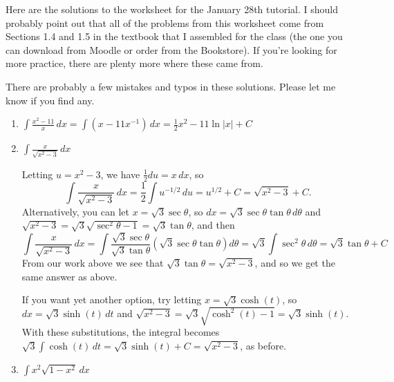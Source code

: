 \documentclass[12pt]{article}
\newcommand{\di}{\displaystyle}
\newcommand{\abs}[1]{\lvert #1\rvert}
\begin{document}
\thispagestyle{fancy}
Here are the solutions to the worksheet for the January 28th tutorial. I should probably point out that all of the problems from this worksheet come from Sections 1.4 and 1.5 in the textbook that I assembled for the class (the one you can download from Moodle or order from the Bookstore). If you're looking for more practice, there are plenty more where these came from.

There are probably a few mistakes and typos in these solutions. Please let me know if you find any.

 \begin{enumerate}
 \item  $\di \int \frac{x^2-11}{x}\,dx = \int (x-11x^{-1})\,dx  = \frac{1}{2}x^2-11\ln\abs{x}+C$

 \item $\di \int \frac{x}{\sqrt{x^2-3}}\,dx$

\medskip

Letting $u=x^2-3$, we have $\frac{1}{2}du = x\,dx$, so
\[
 \int\frac{x}{\sqrt{x^2-3}}\,dx = \frac{1}{2}\int u^{-1/2}\,du = u^{1/2}+C = \sqrt{x^2-3}+C.
\]
Alternatively, you can let $x=\sqrt{3}\sec\theta$, so $dx = \sqrt{3}\sec\theta\tan\theta\,d\theta$ and $\sqrt{x^2-3} = \sqrt{3}\sqrt{\sec^2\theta-1} = \sqrt{3}\tan\theta$, and then
\[
 \int\frac{x}{\sqrt{x^2-3}}\,dx = \int \frac{\sqrt{3}\sec\theta}{\sqrt{3}\tan\theta}(\sqrt{3}\sec\theta\tan\theta)d\theta = \sqrt{3}\int\sec^2\theta\,d\theta = \sqrt{3}\tan\theta+C
\]
From our work above we see that $\sqrt{3}\tan\theta = \sqrt{x^2-3}$, and so we get the same answer as above.

If you want yet another option, try letting $x=\sqrt{3}\cosh(t)$, so $dx = \sqrt{3}\sinh(t)\,dt$ and $\sqrt{x^2-3} = \sqrt{3}\sqrt{\cosh^2(t)-1} = \sqrt{3}\sinh(t)$. With these substitutions, the integral becomes $\di \sqrt{3}\int\cosh(t)\,dt = \sqrt{3}\sinh(t)+C = \sqrt{x^2-3}$, as before. 

 \item $\di \int x^2\sqrt{1-x^2}\,dx$


\end{enumerate}
\end{document}
